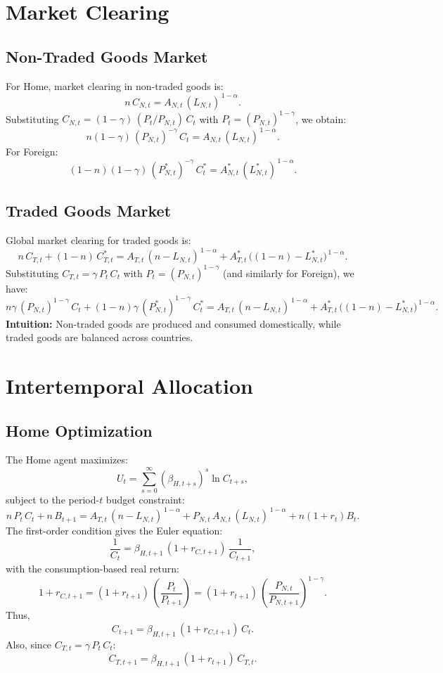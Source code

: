 \documentclass[a4paper,12pt]{article} %
\theoremstyle{nonitalic}
\begin{document}
\section{Market Clearing}

\subsection*{Non-Traded Goods Market}
For Home, market clearing in non-traded goods is:
\[
n\,C_{N,t} = A_{N,t}\,(L_{N,t})^{\,1-\alpha}.
\]
Substituting \( C_{N,t} = (1-\gamma)\,(P_t/P_{N,t})\,C_t \) with \( P_t = (P_{N,t})^{1-\gamma} \), we obtain:
\[
\boxed{n(1-\gamma)\,(P_{N,t})^{-\gamma}\,C_t = A_{N,t}\,(L_{N,t})^{\,1-\alpha}.}
\]
For Foreign:
\[
\boxed{(1-n)(1-\gamma)\,(P^*_{N,t})^{-\gamma}\,C^*_t = A^*_{N,t}\,(L^*_{N,t})^{\,1-\alpha}.}
\]

\subsection*{Traded Goods Market}
Global market clearing for traded goods is:
\[
n\,C_{T,t} + (1-n)\,C^*_{T,t} = A_{T,t}\,(n-L_{N,t})^{\,1-\alpha} + A^*_{T,t}\,\big((1-n)-L^*_{N,t}\big)^{\,1-\alpha}.
\]
Substituting \( C_{T,t}=\gamma\,P_t\,C_t \) with \( P_t=(P_{N,t})^{1-\gamma} \) (and similarly for Foreign), we have:
\[
\boxed{n\gamma\,(P_{N,t})^{1-\gamma}\,C_t + (1-n)\gamma\,(P^*_{N,t})^{1-\gamma}\,C^*_t = A_{T,t}\,(n-L_{N,t})^{\,1-\alpha} + A^*_{T,t}\,\big((1-n)-L^*_{N,t}\big)^{\,1-\alpha}.}
\]
\textbf{Intuition:} Non-traded goods are produced and consumed domestically, while traded goods are balanced across countries.

\section{Intertemporal Allocation}

\subsection*{Home Optimization}
The Home agent maximizes:
\[
U_t = \sum_{s=0}^{\infty} (\beta_{H,t+s})^s \ln C_{t+s},
\]
subject to the period-\( t \) budget constraint:
\[
n\,P_t\,C_t + n\,B_{t+1} = A_{T,t}\,(n-L_{N,t})^{\,1-\alpha} + P_{N,t}\,A_{N,t}\,(L_{N,t})^{\,1-\alpha} + n(1+r_t)B_t.
\]
The first-order condition gives the Euler equation:
\[
\frac{1}{C_t} = \beta_{H,t+1}\,(1+r_{C,t+1})\,\frac{1}{C_{t+1}},
\]
with the consumption-based real return:
\[
1+r_{C,t+1} = (1+r_{t+1})\,\left(\frac{P_t}{P_{t+1}}\right) = (1+r_{t+1})\,\left(\frac{P_{N,t}}{P_{N,t+1}}\right)^{1-\gamma}.
\]
Thus,
\[
\boxed{C_{t+1} = \beta_{H,t+1}\,(1+r_{C,t+1})\,C_t.}
\]
Also, since \( C_{T,t}=\gamma\,P_t\,C_t \):
\[
\boxed{C_{T,t+1} = \beta_{H,t+1}\,(1+r_{t+1})\,C_{T,t}.}
\]
\end{document}
